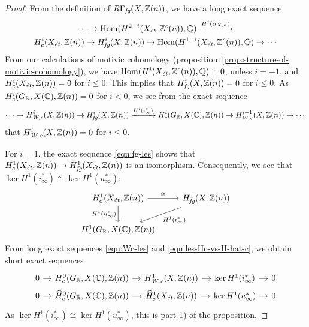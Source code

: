 \documentclass{article}
\numberwithin{equation}{section}
\begin{document}
\begin{proof}
  From the definition of $R\Gamma_\fg (X, \ZZ(n))$, we have a long exact
  sequence
  \begin{multline}
    \label{eqn:fg-les}
    \cdots \to \Hom (H^{2-i} (X_\et, \ZZ^c (n)), \QQ) \xrightarrow{H^i (\alpha_{X,n})} \\
    H^i_c (X_\et, \ZZ(n)) \to
    H^i_\fg (X, \ZZ(n)) \to
    \Hom (H^{1-i} (X_\et, \ZZ^c (n)), \QQ) \to \cdots
  \end{multline}
  From our calculations of motivic cohomology
  (proposition~\ref{prop:structure-of-motivic-cohomology}),
  we have $\Hom (H^i (X_\et, \ZZ^c (n)), \QQ) = 0$, unless $i = -1$, and
  $H^i_c (X_\et, \ZZ(n)) = 0$ for $i \le 0$. This implies that
  $H^i_\fg (X, \ZZ(n)) = 0$ for $i \le 0$.
  As $H^i_c (G_\RR, X(\CC), \ZZ(n)) = 0$ for $i < 0$, we see from the exact
  sequence
  \begin{equation}
    \label{eqn:Wc-les}
    \cdots \to H^i_\Wc (X, \ZZ(n)) \to
    H^i_\fg (X,\ZZ(n)) \xrightarrow{H^i (i^*_\infty)}
    H^i_c (G_\RR, X(\CC), \ZZ(n)) \to
    H^{i+1}_\Wc (X, \ZZ(n)) \to \cdots
  \end{equation}
  that $H^i_\Wc (X, \ZZ(n)) = 0$ for $i \le 0$.

  \vspace{1em}

  For $i = 1$, the exact sequence \eqref{eqn:fg-les} shows that
  $H^1_c (X_\et, \ZZ(n)) \to H^1_\fg (X_\et, \ZZ(n))$ is an isomorphism.
  Consequently, we see that
  $\ker H^1 (i^*_\infty) \cong \ker H^1 (u_\infty^*)$:
  \[ \begin{tikzcd}
      H^1_c (X_\et, \ZZ(n)) \ar{r}{\cong}\ar{d}[swap]{H^1 (u^*_\infty)} & H^1_\fg (X, \ZZ(n)) \ar{dl}{H^1 (i^*_\infty)} \\
      H^1_c (G_\RR, X(\CC), \ZZ(n))
    \end{tikzcd} \]
  From long exact sequences \eqref{eqn:Wc-les} and
  \eqref{eqn:les-Hc-vs-H-hat-c}, we obtain short exact sequences
  \[ \begin{tikzcd}[column sep=1em,row sep=0pt]
      0 \ar{r} & H^0_c (G_\RR, X(\CC), \ZZ(n)) \ar{r} & H^1_\Wc (X, \ZZ(n)) \ar{r} & \ker H^1 (i^*_\infty) \ar{r} & 0 \\
      0 \ar{r} & \widehat{H}^0_c (G_\RR, X(\CC), \ZZ(n)) \ar{r} & \widehat{H}^1_c (X_\et, \ZZ(n)) \ar{r} & \ker H^1 (u_\infty^*) \ar{r} & 0
    \end{tikzcd} \]
  As $\ker H^1 (i^*_\infty) \cong \ker H^1 (u_\infty^*)$,
  this is part 1) of the proposition.


\end{proof}
\end{document}

